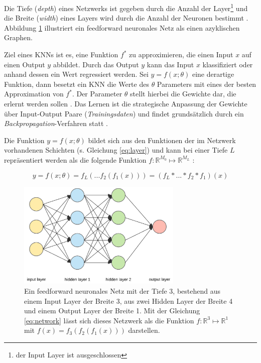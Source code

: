 Die Tiefe (\textit{depth}) eines Netzwerks ist gegeben durch die Anzahl der Layer\footnote{der Input Layer ist ausgeschlossen} und die Breite (\textit{width}) eines Layers wird durch die Anzahl der Neuronen bestimmt \cite{goodfellowDeepLearning2016}. 
Abbildung \ref{fig:neural_net} illustriert ein feedforward neuronales Netz als einen azyklischen Graphen.

Ziel eines KNNs ist es, eine Funktion $f^*$ zu approximieren, die einen Input $x$ auf einen Output $y$ abbildet. Durch das Output $y$ kann das Input $x$ klassifiziert oder anhand dessen ein Wert regressiert werden. Sei $y = f(x; \theta)$ eine derartige Funktion, dann besetzt ein KNN die Werte des $\theta$ Parameters mit eines der besten Approximation von $f^*$. Der Parameter $\theta$ stellt hierbei die Gewichte dar, die erlernt werden sollen \cite{goodfellowDeepLearning2016}. 
Das Lernen ist die strategische Anpassung der Gewichte über Input-Output Paare (\textit{Trainingsdaten}) und findet grundsätzlich durch ein \textit{Backpropagation}-Verfahren statt \cite{goodfellowDeepLearning2016}. 

Die Funktion $y = f(x; \theta)$ bildet sich aus den Funktionen der im Netzwerk vorhandenen Schichten (s. Gleichung \ref{eq:layer}) und kann bei einer Tiefe $L$ repräsentiert werden als die folgende Funktion $f : \mathbb{R}^{M_0} \mapsto \mathbb{R}^{M_L}$ \cite{goodfellowDeepLearning2016, bauckhageInformedMachineLearning}:
 
\begin{equation}
\label{eq:network}
y = f(x; \theta)= f_L(...f_2(f_1(x))) = (f_L * ... * f_2 * f_1)(x)
\end{equation}


\begin{figure}
	\centering
	\includegraphics[width=0.7\textwidth]{images/ann_conv/neural_net.png}
	\caption{Ein feedforward neuronales Netz mit der Tiefe 3, bestehend aus einem Input Layer der Breite 3, aus zwei Hidden Layer der Breite 4 und einem Output Layer der Breite 1. Mit der Gleichung \ref{eq:network} lässt sich dieses Netzwerk als die Funktion $f : \mathbb{R}^{3} \mapsto \mathbb{R}^{1}$ mit $f(x)=f_3(f_2(f_1(x)))$ darstellen. }
	\label{fig:neural_net}
\end{figure}

